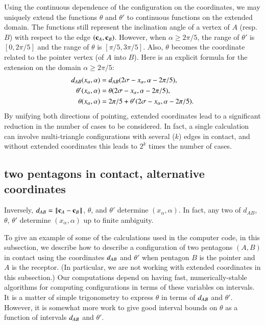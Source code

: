 Using the continuous dependence of the configuration on the
coordinates, we may uniquely extend the functions $\theta$ and
$\theta'$ to continuous functions on the extended domain.  The
functions still represent the inclination angle of a vertex of $A$
(resp. $B$) with respect to the edge $({\mathbf c}_A,{\mathbf c}_B)$.  However, when
$\alpha\ge 2\pi/5$, the range of $\theta'$ is $[0,2\pi/5]$ and the
range of $\theta$ is $[\pi/5,3\pi/5]$.  Also, $\theta$ becomes
the coordinate related to the pointer vertex (of $A$ into $B$).
Here is an explicit formula
for the extension on the domain $\alpha\ge 2\pi/5$:
\begin{align*}
d_{AB}(x_\alpha,\alpha) &=d_{AB}(2\sigma-x_\alpha,\alpha-2\pi/5),\\
\theta'(x_\alpha,\alpha) 
&= \theta(2\sigma-x_\alpha,\alpha-2\pi/5),\\
\theta(x_\alpha,\alpha) 
&= 2\pi/5+ \theta'(2\sigma-x_\alpha,\alpha-2\pi/5).
\end{align*}
By unifying both directions of pointing, extended coordinates lead to
a significant reduction in the number of cases to be considered.  In
fact, a single calculation can involve multi-triangle configurations
with several ($k$) edges in contact, and without extended coordinates
this leads to $2^k$ times the number of cases.




\subsection{two pentagons in contact, alternative
  coordinates}

Inversely, $d_{AB} = \norm{\c_A}{\c_B}$, $\theta$, and $\theta'$
determine $(x_\alpha,\alpha)$.  In fact, any two of $d_{AB}$,
$\theta$, $\theta'$ determine $(x_\alpha,\alpha)$ up to finite
ambiguity.


To give an example of some of the calculations used in the computer
code, in this subsection, we describe how to describe a configuration
of two pentagons $(A,B)$ in contact using the coordinates $d_{AB}$
and $\theta'$ when pentagon $B$ is the pointer and $A$ is the
receptor.  (In particular, we are not working with extended
coordinates in this subsection.)  Our computations depend on having
fast, numerically-stable algorithms for computing configurations in
terms of these variables on intervals.  It is a matter of simple
trigonometry to express $\theta$ in terms of $d_{AB}$ and $\theta'$.
However, it is somewhat more work to give good interval bounds on
$\theta$ as a function of intervals $d_{AB}$ and $\theta'$.

